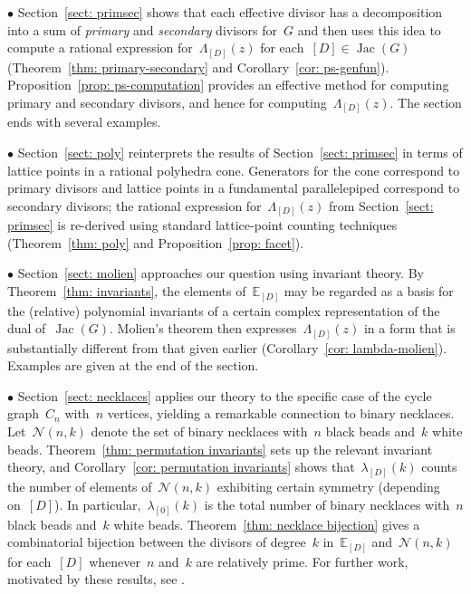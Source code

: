 \documentclass{amsart}
\DeclareMathOperator{\Jac}{Jac}
\newcommand{\E}{\mathbb{E}}
\newcommand{\neck}{\mathcal{N}}
\begin{document}
\noindent$\bullet$ Section~\ref{sect: primsec} shows that each effective
divisor has a decomposition into a sum of {\em primary} and {\em secondary}
divisors for~$G$ and then uses this idea to compute a rational expression
for~$\Lambda_{[D]}(z)$ for each~$[D]\in\Jac(G)$ (Theorem~\ref{thm:
  primary-secondary} and Corollary~\ref{cor: ps-genfun}).
  Proposition~\ref{prop: ps-computation} provides an effective method for
  computing primary and secondary divisors, and hence for
  computing~$\Lambda_{[D]}(z)$.  The section ends with several examples. 
\smallskip

\noindent$\bullet$ Section~\ref{sect: poly} reinterprets the results of
Section~\ref{sect: primsec} in terms of lattice points in a rational polyhedra
cone.  Generators for the cone correspond to primary divisors and lattice points
in a fundamental parallelepiped correspond to secondary divisors;  the rational
expression for~$\Lambda_{[D]}(z)$ from Section~\ref{sect: primsec} is re-derived
using standard lattice-point counting techniques (Theorem~\ref{thm: poly} and
Proposition~\ref{prop: facet}).
\smallskip

\noindent$\bullet$ Section~\ref{sect: molien} approaches our question using
invariant theory.  By Theorem~\ref{thm: invariants}, the elements of~$\E_{[D]}$
may be regarded as a basis for the (relative) polynomial invariants of a certain
complex representation of the dual of~$\Jac(G)$.  Molien's theorem then
expresses~$\Lambda_{[D]}(z)$ in a form that is substantially different from that
given earlier (Corollary~\ref{cor: lambda-molien}).  Examples are
given at the end of the section.
\smallskip

\noindent$\bullet$ Section~\ref{sect: necklaces} applies our theory to the
specific case of the cycle graph~$C_n$ with~$n$ vertices, yielding a remarkable
connection to binary necklaces.  Let~$\neck(n,k)$ denote the set of binary
necklaces with~$n$ black beads and~$k$ white beads.
Theorem~\ref{thm: permutation invariants} sets up the relevant invariant theory,
and Corollary~\ref{cor: permutation invariants} shows that~$\lambda_{[D]}(k)$
counts the number of elements of~$\neck(n,k)$
exhibiting certain symmetry (depending on~$[D]$).  In
particular,~$\lambda_{[0]}(k)$ is the total number of binary necklaces
with~$n$ black beads and~$k$ white beads.  Theorem~\ref{thm: necklace bijection}
gives a combinatorial bijection between the divisors of degree~$k$
in~$\E_{[D]}$ and~$\neck(n,k)$ for each~$[D]$ whenever~$n$ and~$k$ are
relatively prime. For further work, motivated by these results, see
\cite{Oh}. 
\smallskip
\end{document}

